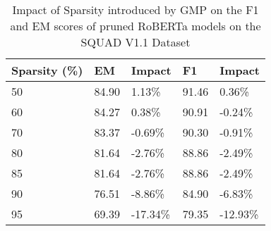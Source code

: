 \begin{table}[!ht]
    \centering
    \small
    \begin{tabular}{|l|l|l|l|l|}
    \hline
        Sparsity (\%) & EM & Impact & F1 & Impact \\ \hline
        50 & 84.90 & 1.13\% & 91.46 & 0.36\% \\ \hline
        60 & 84.27 & 0.38\% & 90.91 & -0.24\% \\ \hline
        70 & 83.37 & -0.69\% & 90.30 & -0.91\% \\ \hline
        80 & 81.64 & -2.76\% & 88.86 & -2.49\% \\ \hline
        85 & 81.64 & -2.76\% & 88.86 & -2.49\% \\ \hline
        90 & 76.51 & -8.86\% & 84.90 & -6.83\% \\ \hline
        95 & 69.39 & -17.34\% & 79.35 & -12.93\% \\ \hline
    \end{tabular}
    \caption{Impact of Sparsity introduced by GMP on the F1 and EM scores of pruned RoBERTa models on the SQUAD V1.1 Dataset}
    \label{tab:gmp-downstream-squad}
\end{table}
